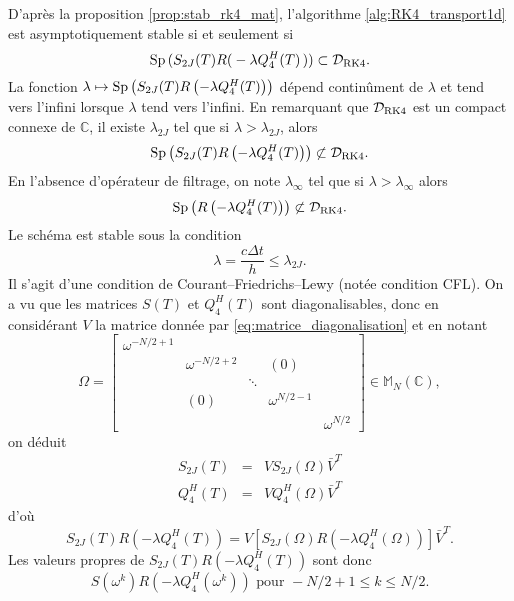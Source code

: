 D'après la proposition \ref{prop:stab_rk4_mat}, l'algorithme \ref{alg:RK4_transport1d} est asymptotiquement stable si et seulement si
\begin{equation}
\Sp \left( S_{2J}(T) R \right( -\lambda Q_{4}^H(T) \left) \right) \subset \mathcal{D}_{\RK4}.
\end{equation}
La fonction $\lambda \mapsto \text{Sp} \left( S_{2J}(T) R \left( -\lambda Q_{4}^H(T) \right) \right)$ dépend continûment de $\lambda$ et tend vers l'infini lorsque $\lambda$ tend vers l'infini. En remarquant que
$\mathcal{D}_{\RK4}$ est un compact connexe de $\mathbb{C}$, il existe $\lambda_{2J}$ tel que si $\lambda > \lambda_{2J}$, alors 
\begin{equation}
\Sp \left( S_{2J}(T) R \left( -\lambda Q_{4}^H(T) \right) \right) \not\subset \mathcal{D}_{\RK4}.
\end{equation}
En l'absence d'opérateur de filtrage, on note $\lambda_{\infty}$ tel que si $\lambda > \lambda_{\infty}$ alors
\begin{equation}
\Sp \left( R \left( -\lambda Q_{4}^H(T) \right) \right) \not\subset \mathcal{D}_{\RK4}.
\end{equation}
Le schéma est stable sous la condition
\begin{equation}
\lambda = \dfrac{c \Delta t}{h} \leq \lambda_{2J}.
\end{equation}
Il s'agit d'une condition de Courant–Friedrichs–Lewy \cite{Courant1928} (notée condition CFL). On a vu que les matrices $S(T)$ et $Q_4^H(T)$ sont diagonalisables, donc en considérant $V$ la matrice donnée par \eqref{eq:matrice_diagonalisation} et en notant
\begin{equation}
\Omega = \begin{bmatrix}
\omega^{-N/2+1} &   &   &   &   \\ 
  & \omega^{-N/2+2} &   & (0) &   \\ 
  &   & \ddots &   &   \\ 
  & (0) &   & \omega^{N/2-1} &   \\ 
  &   &   &   & \omega^{N/2}
\end{bmatrix} \in \mathbb{M}_N(\mathbb{C}),
\end{equation}
on déduit
\begin{equation}
\begin{array}{rcl}
S_{2J}(T) & = & V S_{2J}(\Omega) \bar{V}^T \\
Q_4^H(T) & = & V Q_4^H(\Omega) \bar{V}^T
\end{array}
\end{equation}
d'où
\begin{equation}
S_{2J}(T)R(-\lambda Q_4^H(T)) = V \left[ S_{2J}(\Omega)R(-\lambda Q_4^H(\Omega)) \right] \bar{V}^T.
\end{equation}
Les valeurs propres de $S_{2J}(T)R(-\lambda Q_4^H(T))$ sont donc
\begin{equation}
S(\omega^k)R(-\lambda Q_4^H(\omega^k))  \text{ pour } -N/2+1 \leq k \leq N/2. 
\end{equation}


